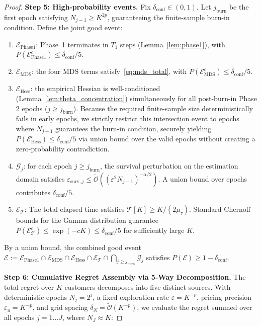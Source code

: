 \documentclass[letterpaper, 10 pt, conference]{IEEEconf}
\begin{document}
\begin{proof}
    \textbf{Step 5: High-probability events.}
    Fix $\delta_{\mathrm{conf}} \in (0, 1)$. Let $j_{\mathrm{burn}}$ be the first epoch satisfying $N_{j-1} \ge K^{2p}$, guaranteeing the finite-sample burn-in condition. Define the joint good event:
    \begin{enumerate}
        \item $\mathcal{E}_{\mathrm{Phase1}}$: Phase~1 terminates in $T_1$ steps (Lemma~\ref{lem:phase1}), with $P(\mathcal{E}_{\mathrm{Phase1}}^c) \leq \delta_{\mathrm{conf}}/5$.
        \item $\mathcal{E}_{\mathrm{MDS}}$: the four MDS terms satisfy~\eqref{eq:mds_total}, with $P(\mathcal{E}_{\mathrm{MDS}}^c) \leq \delta_{\mathrm{conf}}/5$.
        \item $\mathcal{E}_{\mathrm{Hess}}$: the empirical Hessian is well-conditioned (Lemma~\ref{lem:theta_concentration}) simultaneously for all post-burn-in Phase 2 epochs ($j \ge j_{\mathrm{burn}}$). Because the required finite-sample size deterministically fails in early epochs, we strictly restrict this intersection event to epochs where $N_{j-1}$ guarantees the burn-in condition, securely yielding $P(\mathcal{E}_{\mathrm{Hess}}^c) \leq \delta_{\mathrm{conf}}/5$ via union bound over the valid epochs without creating a zero-probability contradiction.
        \item $\mathcal{G}_j$: for each epoch $j \ge j_{\mathrm{burn}}$, the survival perturbation on the estimation domain satisfies $\varepsilon_{\mathrm{surv},j} \leq \widetilde{\mathcal{O}}((\varepsilon^2 N_{j-1})^{-\alpha/2})$. A union bound over epochs contributes $\delta_{\mathrm{conf}}/5$.
        \item $\mathcal{E}_{\mathcal{T}}$: The total elapsed time satisfies $\mathcal{T}[K] \ge K / (2\mu_\tau)$. Standard Chernoff bounds for the Gamma distribution guarantee $P(\mathcal{E}_{\mathcal{T}}^c) \le \exp(-c K) \le \delta_{\mathrm{conf}}/5$ for sufficiently large $K$.
    \end{enumerate}
    By a union bound, the combined good event $\mathcal{E} := \mathcal{E}_{\mathrm{Phase1}} \cap \mathcal{E}_{\mathrm{MDS}} \cap \mathcal{E}_{\mathrm{Hess}} \cap \mathcal{E}_{\mathcal{T}} \cap \bigcap_{j \ge j_{\mathrm{burn}}} \mathcal{G}_j$ satisfies $P(\mathcal{E}) \geq 1 - \delta_{\mathrm{conf}}$.

    \textbf{Step 6: Cumulative Regret Assembly via 5-Way Decomposition.}
    The total regret over $K$ customers decomposes into five distinct sources. With deterministic epochs $N_j = 2^j$, a fixed exploration rate $\varepsilon = K^{-p}$, pricing precision $\varepsilon_u = K^{-p}$, and grid spacing $\delta_N = \widetilde{\mathcal{O}}(K^{-p})$, we evaluate the regret summed over all epochs $j=1 \dots J$, where $N_J \approx K$:


\end{proof}
\end{document}
